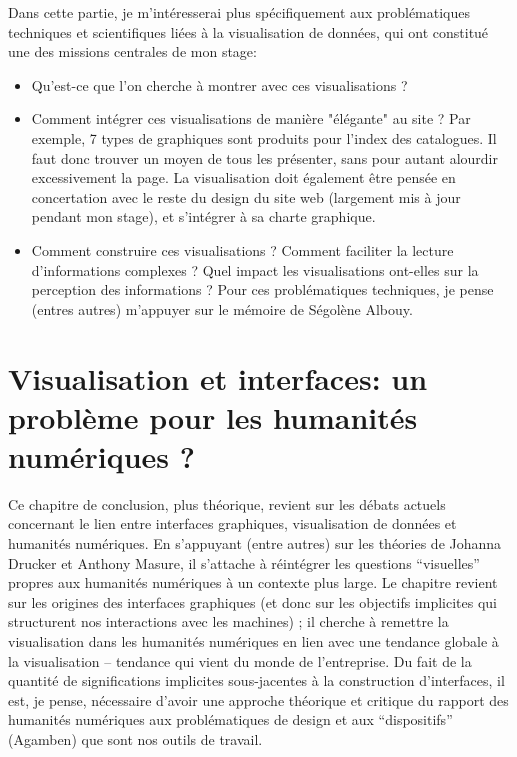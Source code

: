 \documentclass[a4paper, 12pt, twoside]{book}
\begin{document}
Dans cette partie, je m'intéresserai plus spécifiquement aux problématiques techniques et scientifiques liées à la visualisation de données, qui ont constitué une des missions centrales de mon stage:
\begin{itemize}
	\item Qu'est-ce que l'on cherche à montrer avec ces visualisations ?
 	\item Comment intégrer ces visualisations de manière "élégante" au site ? Par exemple, 7 types de graphiques sont produits pour l'index des catalogues. Il faut donc trouver un moyen de tous les présenter, sans pour autant alourdir excessivement la page. La visualisation doit également être pensée en concertation avec le reste du design du site web (largement mis à jour pendant mon stage), et s'intégrer à sa charte graphique.
	\item Comment construire ces visualisations ? Comment faciliter la lecture d'informations complexes ? Quel impact les visualisations ont-elles sur la perception des informations ? Pour ces problématiques techniques, je pense (entres autres) m'appuyer sur le mémoire de Ségolène Albouy.
\end{itemize}

\chapter{Visualisation et interfaces: un problème pour les humanités numériques ?}
Ce chapitre de conclusion, plus théorique, revient sur les débats actuels concernant le lien entre interfaces graphiques, visualisation de données et humanités numériques. En s'appuyant (entre autres) sur les théories de Johanna Drucker et Anthony Masure, il s'attache à réintégrer les questions \enquote{visuelles} propres aux humanités numériques à un contexte plus large. Le chapitre revient sur les origines des interfaces graphiques (et donc sur les objectifs implicites qui structurent nos interactions avec les machines) ; il cherche à remettre la visualisation dans les humanités numériques en lien avec une tendance globale à la visualisation -- tendance qui vient du monde de l'entreprise. Du fait de la quantité de significations implicites sous-jacentes à la construction d'interfaces, il est, je pense, nécessaire d'avoir une approche théorique et critique du rapport des humanités numériques aux problématiques de design et aux \enquote{dispositifs} (Agamben) que sont nos outils de travail.

\listoffigures
\listoftables
\tableofcontents
\end{document}
